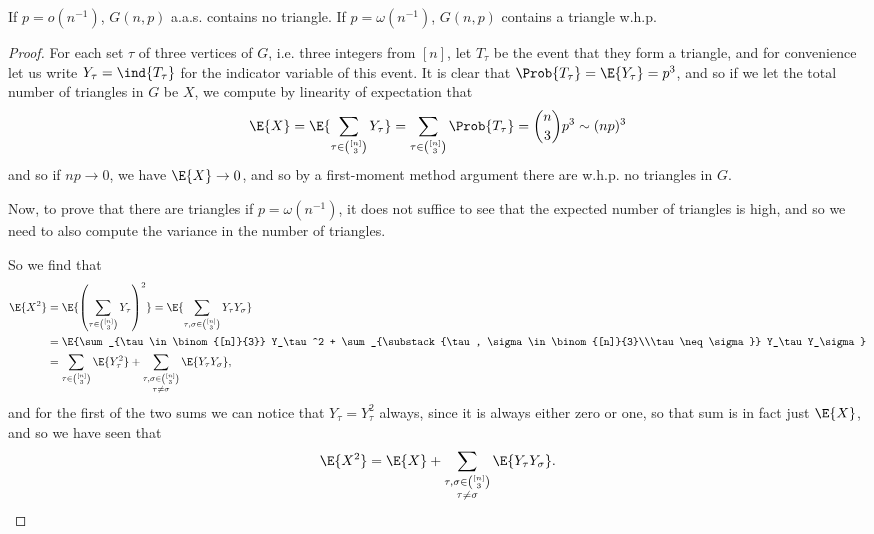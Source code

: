 \documentclass[nobib]{tufte-handout}
\begin{document}
\begin{proposition}
  If $p = o\left(n^{-1}\right)$, $G(n,p)$ a.a.s. contains no triangle. If $p = \omega\left(n^{-1}\right)$, $G(n,p)$ contains a triangle w.h.p.

  \begin{proof}
    For each set $\tau$ of three vertices of $G$, i.e. three integers from $[n]$, let $T_\tau$ be the event that they form a triangle, and for convenience let us write $Y_\tau = \ind{T_\tau}$ for the indicator variable of this event. It is clear that $\Prob{T_\tau} = \E{Y_\tau} = p^3$, and so if we let the total number of triangles in $G$ be $X$, we compute by linearity of expectation that
    $$\E{X} = \E{\sum_{\tau \in \binom{[n]}{3}} Y_\tau} = \sum_{\tau \in \binom{[n]}{3}} \Prob{T_\tau} = \binom{n}{3}p^3 \sim (np)^3$$
    and so if $np \to 0$, we have $\E{X} \to 0$, and so by a first-moment method argument there are w.h.p. no triangles in $G$.

    Now, to prove that there are triangles if $p = \omega\left( n^{-1} \right)$, it does not suffice to see that the expected number of triangles is high, and so we need to also compute the variance in the number of triangles.

    So we find that
    \begin{align*}
      \E{X^2} &= \E{\left(\sum_{\tau \in \binom{[n]}{3}} Y_\tau\right)^2}
      = \E{\sum_{\tau, \sigma \in \binom{[n]}{3}} Y_\tau Y_\sigma}\\
      &= \E{\sum_{\tau \in \binom{[n]}{3}} Y_\tau^2 + \sum_{\substack{\tau, \sigma \in \binom{[n]}{3}\\\tau \neq \sigma}} Y_\tau Y_\sigma}\\
      &= \sum_{\tau \in \binom{[n]}{3}} \E{Y_\tau^2} + \sum_{\substack{\tau, \sigma \in \binom{[n]}{3}\\\tau \neq \sigma}} \E{Y_\tau Y_\sigma},
    \end{align*}
    and for the first of the two sums we can notice that $Y_\tau = Y_\tau^2$ always, since it is always either zero or one, so that sum is in fact just $\E{X}$, and so we have seen that
    $$\E{X^2} = \E{X} + \sum_{\substack{\tau, \sigma \in \binom{[n]}{3}\\\tau \neq \sigma}} \E{Y_\tau Y_\sigma}.$$


\end{proof}
\end{proposition}
\end{document}
